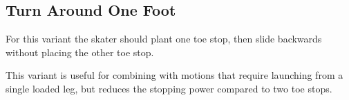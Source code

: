 \subsection*{Turn Around One Foot}

For this variant the skater should plant one toe stop, then slide backwards without placing the other toe stop.

This variant is useful for combining with motions that require launching from a single loaded leg, but reduces the stopping power compared to two toe stops. 
